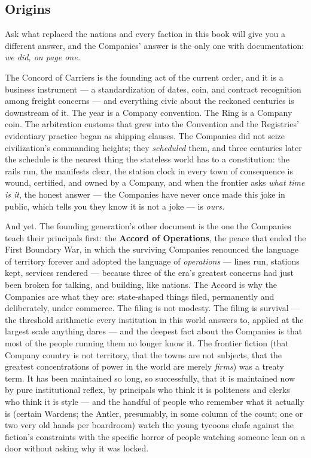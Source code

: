 \subsection{Origins}

Ask what replaced the nations and every faction in this book will give you a different answer, and the Companies' answer is the only one with documentation: \textit{we did, on page one.}

The Concord of Carriers is the founding act of the current order, and it is a business instrument --- a standardization of dates, coin, and contract recognition among freight concerns --- and everything civic about the reckoned centuries is downstream of it. The year is a Company convention. The Ring is a Company coin. The arbitration customs that grew into the Convention and the Registries' evidentiary practice began as shipping clauses. The Companies did not seize civilization's commanding heights; they \textit{scheduled} them, and three centuries later the schedule is the nearest thing the stateless world has to a constitution: the rails run, the manifests clear, the station clock in every town of consequence is wound, certified, and owned by a Company, and when the frontier asks \textit{what time is it}, the honest answer --- the Companies have never once made this joke in public, which tells you they know it is not a joke --- is \textit{ours.}

And yet. The founding generation's other document is the one the Companies teach their principals first: the \textbf{Accord of Operations}, the peace that ended the First Boundary War, in which the surviving Companies renounced the language of territory forever and adopted the language of \textit{operations} --- lines run, stations kept, services rendered --- because three of the era's greatest concerns had just been broken for talking, and building, like nations. The Accord is why the Companies are what they are: state-shaped things filed, permanently and deliberately, under commerce. The filing is not modesty. The filing is survival --- the threshold arithmetic every institution in this world answers to, applied at the largest scale anything dares --- and the deepest fact about the Companies is that most of the people running them no longer know it. The frontier fiction (that Company country is not territory, that the towns are not subjects, that the greatest concentrations of power in the world are merely \textit{firms}) was a treaty term. It has been maintained so long, so successfully, that it is maintained now by pure institutional reflex, by principals who think it is politeness and clerks who think it is style --- and the handful of people who remember what it actually is (certain Wardens; the Antler, presumably, in some column of the count; one or two very old hands per boardroom) watch the young tycoons chafe against the fiction's constraints with the specific horror of people watching someone lean on a door without asking why it was locked.

